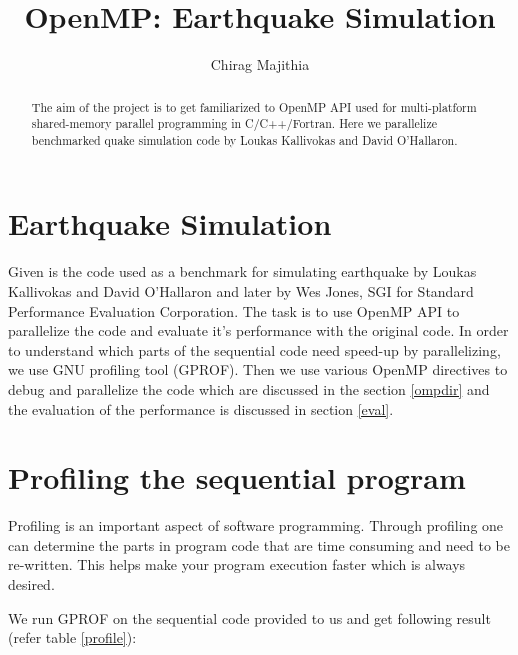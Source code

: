 \documentclass[a4paper, 10pt, conference]{IEEEtran}      %
\title{\LARGE \bf OpenMP: Earthquake Simulation}
\author{Chirag Majithia}
\begin{document}
	
	
	\maketitle
	\thispagestyle{empty}
	\pagestyle{empty}
	
	
	
	\begin{abstract}
		The aim of the project is to get familiarized to OpenMP API used for multi-platform shared-memory parallel programming in C/C++/Fortran. Here we parallelize benchmarked quake simulation code by Loukas Kallivokas and David O'Hallaron.
		
	\end{abstract}
	
	
	
	\section{Earthquake Simulation}
	
	Given is the code used as a benchmark for simulating earthquake by Loukas Kallivokas and David O'Hallaron and later by Wes Jones, SGI for Standard Performance Evaluation Corporation. The task is to use OpenMP API to parallelize the code and evaluate it's performance with the original code.
	In order to understand which parts of the sequential code need speed-up by parallelizing, we use GNU profiling tool (GPROF). Then we use various OpenMP directives to debug and parallelize the code which are discussed in the section \ref{ompdir} and the evaluation of the performance is discussed in section \ref{eval}. 
	
	\section{Profiling the sequential program}
	
	Profiling is an important aspect of software programming. Through profiling one can determine the parts in program code that are time consuming and need to be re-written. This helps make your program execution faster which is always desired.
	
	We run GPROF on the sequential code provided to us and get following result (refer table \ref{profile}):
	
\end{document}
